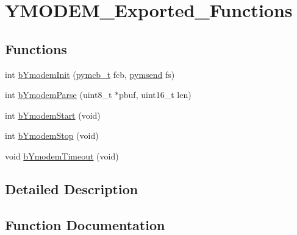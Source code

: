 \hypertarget{group___y_m_o_d_e_m___exported___functions}{}\section{Y\+M\+O\+D\+E\+M\+\_\+\+Exported\+\_\+\+Functions}
\label{group___y_m_o_d_e_m___exported___functions}
\subsection*{Functions}
\begin{DoxyCompactItemize}
\item 
int \mbox{\hyperlink{group___y_m_o_d_e_m___exported___functions_gaf6a838b07581ba33b8eef73401588b19}{b\+Ymodem\+Init}} (\mbox{\hyperlink{group___y_m_o_d_e_m___exported___types_definitions_gad74fcad348f660a999a9903fa1c5c1ac}{pymcb\+\_\+t}} fcb, \mbox{\hyperlink{group___y_m_o_d_e_m___exported___types_definitions_ga2429c212fbcca5113135547532d6181b}{pymsend}} fs)
\item 
int \mbox{\hyperlink{group___y_m_o_d_e_m___exported___functions_ga73c58a30399bd5d24cc1105db4d5b137}{b\+Ymodem\+Parse}} (uint8\+\_\+t $\ast$pbuf, uint16\+\_\+t len)
\item 
int \mbox{\hyperlink{group___y_m_o_d_e_m___exported___functions_ga3fbe65872c4c467041e8023d8e87477e}{b\+Ymodem\+Start}} (void)
\item 
int \mbox{\hyperlink{group___y_m_o_d_e_m___exported___functions_ga9c639ac387c903a4daa463db207108f1}{b\+Ymodem\+Stop}} (void)
\item 
void \mbox{\hyperlink{group___y_m_o_d_e_m___exported___functions_ga519c12a30fd01012295f26bd4d153828}{b\+Ymodem\+Timeout}} (void)
\end{DoxyCompactItemize}


\subsection{Detailed Description}


\subsection{Function Documentation}
\mbox{\label{group___y_m_o_d_e_m___exported___functions_gaf6a838b07581ba33b8eef73401588b19}} 
